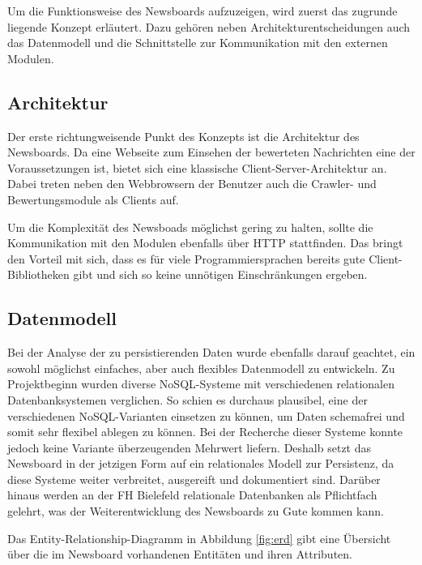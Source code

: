 Um die Funktionsweise des Newsboards aufzuzeigen, wird zuerst das zugrunde liegende Konzept erläutert.
Dazu gehören neben Architekturentscheidungen auch das Datenmodell und die Schnittstelle
zur Kommunikation mit den externen Modulen.

\subsection{Architektur}
Der erste richtungweisende Punkt des Konzepts ist die Architektur des Newsboards.
Da eine Webseite zum Einsehen der bewerteten Nachrichten eine der Voraussetzungen ist,
bietet sich eine klassische Client-Server-Architektur an.
Dabei treten neben den Webbrowsern der Benutzer auch die Crawler-
und Bewertungsmodule als Clients auf.

Um die Komplexität des Newsboads möglichst gering zu halten, sollte die Kommunikation
mit den Modulen ebenfalls über HTTP stattfinden. Das bringt den Vorteil mit sich,
dass es für viele Programmiersprachen bereits gute Client-Bibliotheken gibt
und sich so keine unnötigen Einschränkungen ergeben.

\subsection{Datenmodell}
Bei der Analyse der zu persistierenden Daten wurde ebenfalls darauf geachtet, ein
sowohl möglichst einfaches, aber auch flexibles Datenmodell zu entwickeln. Zu Projektbeginn wurden diverse NoSQL-Systeme mit verschiedenen relationalen Datenbanksystemen verglichen.
So schien es durchaus plausibel, eine der verschiedenen
NoSQL-Varianten einsetzen zu können, um Daten schemafrei und somit sehr flexibel 
ablegen zu können. Bei der Recherche dieser Systeme konnte jedoch keine Variante
überzeugenden Mehrwert liefern. Deshalb setzt das Newsboard in der jetzigen Form 
auf ein relationales Modell zur Persistenz, da diese Systeme weiter
verbreitet, ausgereift und dokumentiert sind.
Darüber hinaus werden an der FH Bielefeld relationale Datenbanken als Pflichtfach gelehrt,
was der Weiterentwicklung des Newsboards zu Gute kommen kann.

Das Entity-Relationship-Diagramm in Abbildung \ref{fig:erd} gibt eine Übersicht über die im Newsboard
vorhandenen Entitäten und ihren Attributen.

